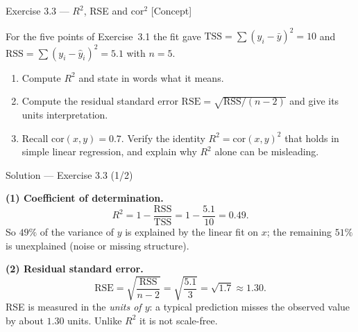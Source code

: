 \documentclass[aspectratio=169,11pt]{beamer}
\begin{document}
\begin{frame}{Exercise 3.3 --- $R^2$, RSE and $\mathrm{cor}^2$ [Concept]}
  \begin{exercise}
    For the five points of Exercise~3.1 the fit gave
    $\mathrm{TSS}=\sum(y_i-\bar y)^2 = 10$ and
    $\mathrm{RSS}=\sum(y_i-\hat y_i)^2 = 5.1$ with $n=5$.
    \begin{enumerate}
      \item Compute $R^2$ and state in words what it means.
      \item Compute the residual standard error
            $\mathrm{RSE}=\sqrt{\mathrm{RSS}/(n-2)}$ and give its units
            interpretation.
      \item Recall $\mathrm{cor}(x,y)=0.7$. Verify the identity
            $R^2=\mathrm{cor}(x,y)^2$ that holds in simple linear
            regression, and explain why $R^2$ alone can be misleading.
    \end{enumerate}
  \end{exercise}
\end{frame}

\begin{frame}{Solution --- Exercise 3.3 (1/2)}
  \begin{solutionbox}
    \textbf{(1) Coefficient of determination.}
    \[
      R^2 = 1-\frac{\mathrm{RSS}}{\mathrm{TSS}} = 1-\frac{5.1}{10}=0.49.
    \]
    So $49\%$ of the variance of $y$ is explained by the linear fit on
    $x$; the remaining $51\%$ is unexplained (noise or missing
    structure).

    \textbf{(2) Residual standard error.}
    \[
      \mathrm{RSE}=\sqrt{\frac{\mathrm{RSS}}{n-2}}
        =\sqrt{\frac{5.1}{3}}=\sqrt{1.7}\approx 1.30.
    \]
    RSE is measured in the \emph{units of $y$}: a typical prediction
    misses the observed value by about $1.30$ units. Unlike $R^2$ it is
    not scale-free.
  \end{solutionbox}
\end{frame}
\end{document}
